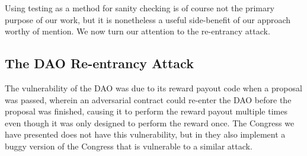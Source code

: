 \documentclass[twoside,11pt,openright]{report}
\begin{document}
Using testing as a method for sanity checking is of course not the primary purpose of our work, but it is nonetheless a useful side-benefit of our approach worthy of mention. We now turn our attention to the re-entrancy attack.

\subsection{The DAO Re-entrancy Attack}
The vulnerability of the DAO was due to its reward payout code when a proposal was passed, wherein an adversarial contract could re-enter the DAO before the proposal was finished, causing it to perform the reward payout multiple times even though it was only designed to perform the reward once. The Congress we have presented does not have this vulnerability, but in \cite{nielsen2019smart} they also implement a buggy version of the Congress that is vulnerable to a similar attack.
\end{document}
